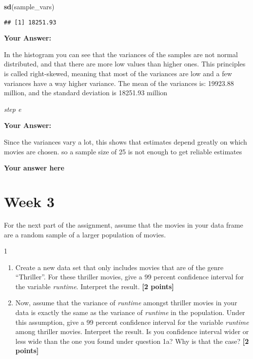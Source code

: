 \documentclass[
]{article}
\newenvironment{Shaded}{\begin{snugshade}}{\end{snugshade}}
\newcommand{\FunctionTok}[1]{\textcolor[rgb]{0.13,0.29,0.53}{\textbf{#1}}}
\newcommand{\NormalTok}[1]{#1}
\providecommand{\tightlist}{%
  \setlength{\itemsep}{0pt}\setlength{\parskip}{0pt}}
\begin{document}
\begin{Shaded}
\begin{Highlighting}[]
\FunctionTok{sd}\NormalTok{(sample\_vars)}
\end{Highlighting}
\end{Shaded}

\begin{verbatim}
## [1] 18251.93
\end{verbatim}

\textbf{Your Answer:}

In the histogram you can see that the variances of the samples are not
normal distributed, and that there are more low values than higher ones.
This principles is called right-skewed, meaning that most of the
variances are low and a few variances have a way higher variance. The
mean of the variances is: 19923.88 million, and the standard deviation
is 18251.93 million

\emph{step e}

\textbf{Your Answer:}

Since the variances vary a lot, this shows that estimates depend greatly
on which movies are chosen. so a sample size of 25 is not enough to get
reliable estimates

\textbf{Your answer here}

\section{Week 3}\label{week-3}

For the next part of the assignment, assume that the movies in your data
frame are a random sample of a larger population of movies.

1

\begin{enumerate}
\def\labelenumi{\alph{enumi}.}
\tightlist
\item
  Create a new data set that only includes movies that are of the genre
  ``Thriller''. For these thriller movies, give a 99 percent confidence
  interval for the variable \emph{runtime}. Interpret the result.
  \textbf{[2 points]}
\item
  Now, assume that the variance of \emph{runtime} amongst thriller
  movies in your data is exactly the same as the variance of
  \emph{runtime} in the population. Under this assumption, give a 99
  percent confidence interval for the variable \emph{runtime} among
  thriller movies. Interpret the result. Is you confidence interval
  wider or less wide than the one you found under question 1a? Why is
  that the case? \textbf{[2 points]}
\end{enumerate}
\end{document}
